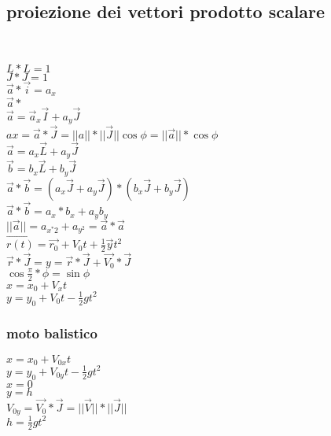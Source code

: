 \documentclass{book}
\begin{document}
\subsection{proiezione dei vettori prodotto scalare}
 \\
\begin{multicols}{3} 
$L*L=1$\\
$J*J=1$\\
$\overrightarrow{a}*\overrightarrow{i}=a_x$\\
$\overrightarrow{a}*$\\
$\overrightarrow{a}=\overrightarrow{a}_x\overrightarrow{I}+a_y\overrightarrow{J}$\\
$ax=\overrightarrow{a}*\overrightarrow{J}=||a||*||\overrightarrow{J}||\cos{\phi}=||\overrightarrow{a}||*\cos{\phi}$\\
$\overrightarrow{a}=a_x\overrightarrow{L}+a_y\overrightarrow{J}$\\
$\overrightarrow{b}=b_x\overrightarrow{L}+b_y\overrightarrow{J}$\\
$\overrightarrow{a}*\overrightarrow{b}=(a_x\overrightarrow{J}+a_y\overrightarrow{J})*(b_x\overrightarrow{J}+b_y\overrightarrow{J})$\\
$\overrightarrow{a}*\overrightarrow{b}=a_x*b_x+a_yb_y$\\
$||\overrightarrow{a}||=a_{x^*2}+a_{y^2}=\overrightarrow{a}*\overrightarrow{a}$\\
$\overrightarrow{r(t)}=\overrightarrow{r_0}+V_0t+\frac{1}{2}\overrightarrow{y}t^2$\\
$\overrightarrow{r}*\overrightarrow{J}=y=\overrightarrow{r}*\overrightarrow{J}+\overrightarrow{V_0}*\overrightarrow{J}$\\
$\cos{\frac{\pi}{2}*\phi}=\sin{\phi}$\\
$x=x_0+V_xt$\\
$y=y_0+V_0t-\frac{1}{2}gt^2$\\
\end{multicols} 
\subsubsection{moto balistico}
$x=x_0+V_{0x}t$\\
$y=y_0+V_{0y}t-\frac{1}{2}gt^2$\\
$x=0$\\
$y=h$\\
$V_{0y}=\overrightarrow{V_0}*\overrightarrow{J}=||\overrightarrow{V}||*||\overrightarrow{J}||$\\
$h=\frac{1}{2}gt^2$\\
\end{document}
